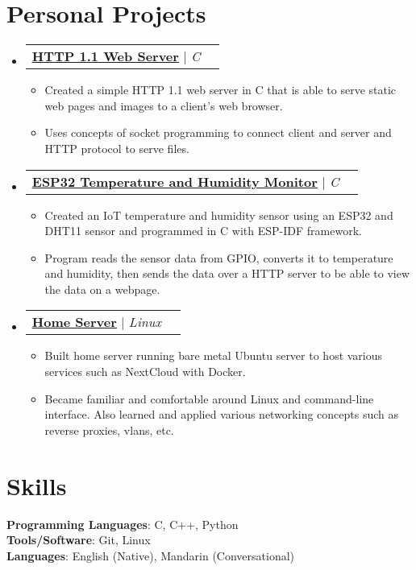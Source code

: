 \documentclass[letterpaper,12pt]{article}
\makeatletter
\newcommand{\resumeItem}[1]{
  \item\small{
    {#1 \vspace{-2pt}}
  }
}
\newcommand{\resumeProjectHeading}[2]{
    \item
    \begin{tabular*}{0.97\textwidth}{l@{\extracolsep{\fill}}r}
      \small#1 & #2 \\
    \end{tabular*}\vspace{-7pt}
}
\newcommand{\resumeSubHeadingListStart}{\begin{itemize}[leftmargin=0.15in, label={}]}
\newcommand{\resumeSubHeadingListEnd}{\end{itemize}}
\newcommand{\resumeItemListStart}{\begin{itemize}}
\newcommand{\resumeItemListEnd}{\end{itemize}\vspace{-5pt}}
\makeatother
\begin{document}
\section{Personal Projects}
    \resumeSubHeadingListStart
      \resumeProjectHeading
      {\textbf{\href{https://github.com/jamesyoung-15/http-server}{\underline {HTTP 1.1 Web Server}}} $|$ \emph{C}}{}
      \resumeItemListStart
        \resumeItem{\normalsize{Created a simple HTTP 1.1 web server in C that is able to serve static web pages and images to a client's web browser.}} 
        \resumeItem{\normalsize{Uses concepts of socket programming to connect client and server and HTTP protocol to serve files.}}
      \resumeItemListEnd
      \resumeProjectHeading
      {\textbf{\href{https://github.com/jamesyoung-15/esp32-dht11-serve}{\underline {ESP32 Temperature and Humidity Monitor}}} $|$ \emph{C}}{}
      \resumeItemListStart
        \resumeItem{\normalsize{Created an IoT temperature and humidity sensor using an ESP32 and DHT11 sensor and programmed in C with ESP-IDF framework.}}
        \resumeItem{\normalsize{Program reads the sensor data from GPIO, converts it to temperature and humidity, then sends the data over a HTTP server to be able to view the data on a webpage.}}
      \resumeItemListEnd
      \resumeProjectHeading
          {\textbf{\href{https://github.com/jamesyoung-15/homeserver}{\underline {Home Server}}} $|$ \emph{Linux}}{}
          \resumeItemListStart
            \resumeItem{\normalsize{Built home server running bare metal Ubuntu server to host various services such as NextCloud with Docker.}}
            \resumeItem{\normalsize{Became familiar and comfortable around Linux and command-line interface. Also learned and applied various networking concepts such as reverse proxies, vlans, etc.}}
      \resumeItemListEnd

    \resumeSubHeadingListEnd



%
\section{Skills}
 \begin{itemize}[leftmargin=0.15in, label={}]
    \small{\item{
     \textbf{Programming Languages}{: C, C++, Python} \\
     \textbf{Tools/Software}{: Git, Linux} \\
     \textbf{Languages}{: English (Native), Mandarin (Conversational)} \\
    }}
 \end{itemize}
\end{document}
